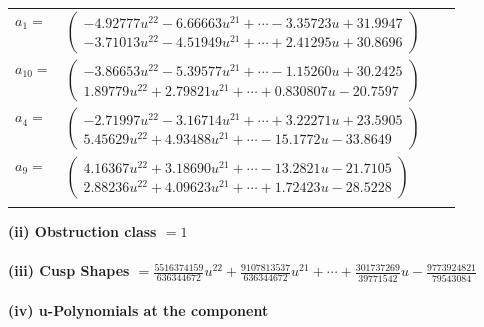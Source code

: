 \documentclass[1p]{elsarticle_modified}
\theoremstyle{definition}
\begin{document}
\begin{tabular}{m{7pt} m{180pt} m{7pt} m{180pt} }
\flushright $a_{1}=$&$\begin{pmatrix}-4.92777 u^{22}-6.66663 u^{21}+\cdots-3.35723 u+31.9947\\-3.71013 u^{22}-4.51949 u^{21}+\cdots+2.41295 u+30.8696\end{pmatrix}$ \\
\flushright $a_{10}=$&$\begin{pmatrix}-3.86653 u^{22}-5.39577 u^{21}+\cdots-1.15260 u+30.2425\\1.89779 u^{22}+2.79821 u^{21}+\cdots+0.830807 u-20.7597\end{pmatrix}$ \\
\flushright $a_{4}=$&$\begin{pmatrix}-2.71997 u^{22}-3.16714 u^{21}+\cdots+3.22271 u+23.5905\\5.45629 u^{22}+4.93488 u^{21}+\cdots-15.1772 u-33.8649\end{pmatrix}$ \\
\flushright $a_{9}=$&$\begin{pmatrix}4.16367 u^{22}+3.18690 u^{21}+\cdots-13.2821 u-21.7105\\2.88236 u^{22}+4.09623 u^{21}+\cdots+1.72423 u-28.5228\end{pmatrix}$\\&\end{tabular}
\flushleft \textbf{(ii) Obstruction class $= 1$}\\~\\
\flushleft \textbf{(iii) Cusp Shapes $= \frac{5516374159}{636344672} u^{22}+\frac{9107813537}{636344672} u^{21}+\cdots+\frac{301737269}{39771542} u-\frac{9773924821}{79543084}$}\\~\\
\newpage\renewcommand{\arraystretch}{1}
\flushleft \textbf{(iv) u-Polynomials at the component}\newline \\
\end{document}
